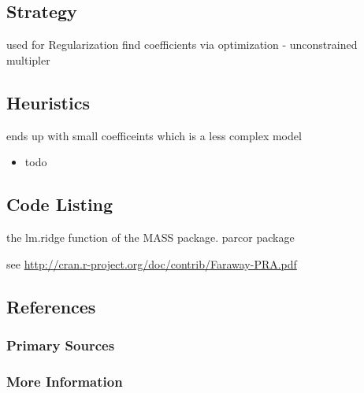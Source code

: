 \subsection{Strategy}

used for Regularization
find coefficients via optimization - unconstrained multipler

\subsection{Heuristics}

ends up with small coefficeints which is a less complex model

\begin{itemize}
	\item todo
\end{itemize}

\subsection{Code Listing}

the lm.ridge function of the MASS package.
parcor package


see \url{http://cran.r-project.org/doc/contrib/Faraway-PRA.pdf}

\subsection{References}

\subsubsection{Primary Sources}


\subsubsection{More Information}



